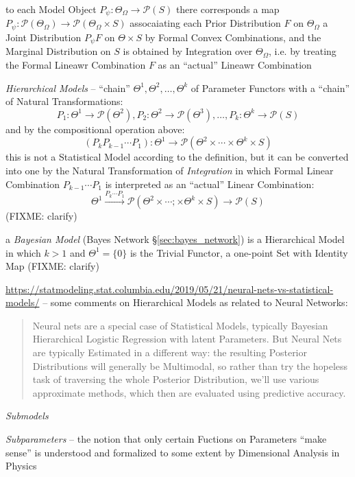 to each Model Object $P_\psi : \Theta_\Omega \to \mathcal{P}(S)$ there
corresponds a map
$P_\psi : \mathcal{P}(\Theta_\Omega) \to \mathcal{P}(\Theta_\Omega \times S)$
assocaiating each Prior Distribution $F$ on $\Theta_\Omega$ a Joint Distribution
$P_\psi F$ on $\Theta \times S$ by Formal Convex Combinations, and the Marginal
Distribution on $S$ is obtained by Integration over $\Theta_\Omega$, i.e. by
treating the Formal Lineawr Combination $F$ as an ``actual'' Lineawr Combination

\emph{Hierarchical Models} -- ``chain'' $\Theta^1, \Theta^2, \ldots, \Theta^k$
of Parameter Functors with a ``chain'' of Natural Transformations:
\[
  P_1:\Theta^1 \to \mathcal{P}(\Theta^2),
  P_2:\Theta^2 \to \mathcal{P}(\Theta^3), \ldots,
  P_k:\Theta^k \to \mathcal{P}(S)
\]
and by the compositional operation above:
\[
  (P_k P_{k-1} \cdots P_1):
    \Theta^1 \to \mathcal{P}(\Theta^2 \times \cdots \times \Theta^k \times S)
\]
this is not a Statistical Model according to the definition, but it can be
converted into one by the Natural Transformation of \emph{Integration} in which
Formal Linear Combination $P_{k-1} \cdots P_1$ is interpreted as an ``actual''
Linear Combination:
\[
  \Theta^1 \xrightarrow{P_k \cdots P_1}
    \mathcal{P}(\Theta^2 \times \cdots ;\times \Theta^k \times S) \to
    \mathcal{P}(S)
\]
(FIXME: clarify)

a \emph{Bayesian Model} (Bayes Network \S\ref{sec:bayes_network}) is a
Hierarchical Model in which $k > 1$ and $\Theta^1 = \{0\}$ is the Trivial
Functor, a one-point Set with Identity Map (FIXME: clarify)

\url{https://statmodeling.stat.columbia.edu/2019/05/21/neural-nets-vs-statistical-models/}
-- some comments on Hierarchical Models as related to Neural Networks:
\begin{quote}
  Neural nets are a special case of Statistical Models, typically Bayesian
  Hierarchical Logistic Regression with latent Parameters. But Neural Nets are
  typically Estimated in a different way: the resulting Posterior Distributions
  will generally be Multimodal, so rather than try the hopeless task of
  traversing the whole Posterior Distribution, we’ll use various approximate
  methods, which then are evaluated using predictive accuracy.
\end{quote}

\emph{Submodels}

\emph{Subparameters} -- the notion that only certain Fuctions on Parameters
``make sense'' is understood and formalized to some extent by Dimensional
Analysis in Physics

